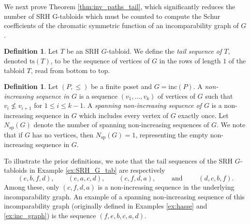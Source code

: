 \documentclass[12pt]{amsart}
\newcommand{\andd}{\qquad\text{ and }\qquad}
\numberwithin{equation}{section}
\theoremstyle{plain}
\theoremstyle{definition}
\newtheorem{definition}[equation]{Definition}
\theoremstyle{remark}
\begin{document}


We next prove Theorem \ref{thm:inv_paths_tail}, which significantly reduces the number of SRH G-tabloids which must be counted to compute the Schur coefficients of the chromatic symmetric function of an incomparability graph of $G$.

\begin{definition}
Let $T$ be an SRH $G$-tabloid. We define the \textit{tail sequence of $T$}, denoted $\text{ts}(T)$, to be the sequence of vertices of $G$ in the rows of length $1$ of the tabloid $T$, read from bottom to top.
\end{definition}

\begin{definition}
Let $(P,\le)$ be a finite poset and $G=\text{inc}(P)$. A \textit{non-increasing sequence in $G$} is a sequence $(v_1,\dots,v_k)$ of vertices of $G$ such that $v_i \nleq v_{i+1}$ for $1\le i \le k-1$. A \textit{spanning non-increasing sequence of $G$} is a non-increasing sequence in $G$ which includes every vertex of $G$ exactly once. Let $N_{\mathrm{sp}}(G)$ denote the number of spanning non-increasing sequences of $G$. We note that if $G$ has no vertices, then $N_{\mathrm{sp}}(G)=1$, representing the empty non-increasing sequence in $G$. 
\end{definition}

To illustrate the prior definitions, we note that the tail sequences of the SRH $G$-tabloids in Example \ref{ex:SRH_G_tab} are respectively
\[
(e,b,f,d),\qquad (e,a,c,d),\qquad (c,f,d,a),\andd (d,c,b,f).
\]
Among these, only $(c,f,d,a)$ is a non-increasing sequence in the underlying incomparability graph. An example of a spanning non-increasing sequence of this incomparability graph (originally defined in Examples \ref{ex:hasse} and \ref{ex:inc_graph}) is the sequence $(f,e,b,c,a,d)$.
\end{document}
